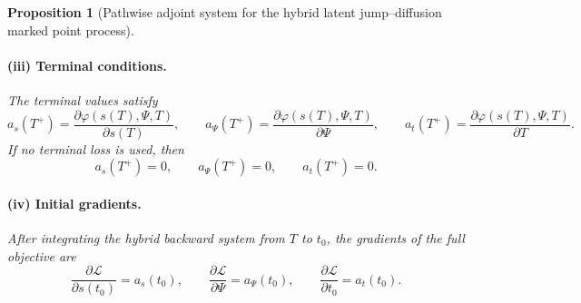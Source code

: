 \documentclass[11pt]{article}
\newtheorem{proposition}{Proposition}
\theoremstyle{definition}
\numberwithin{equation}{section}
\numberwithin{theorem}{section}
\numberwithin{proposition}{section}
\numberwithin{lemma}{section}
\numberwithin{corollary}{section}
\numberwithin{definition}{section}
\numberwithin{remark}{section}
\newcommand{\1}{\mathbbm{1}}
\begin{document}
\begin{proposition}[Pathwise adjoint system for the hybrid latent jump--diffusion marked point process]
\paragraph{(iii) Terminal conditions.}
The terminal values satisfy
\begin{equation}
\label{eq:app_prop_terminal}
a_s(T^+)=\frac{\partial \varphi(s(T),\Psi,T)}{\partial s(T)},
\qquad
a_\Psi(T^+)=\frac{\partial \varphi(s(T),\Psi,T)}{\partial \Psi},
\qquad
a_t(T^+)=\frac{\partial \varphi(s(T),\Psi,T)}{\partial T}.
\end{equation}
If no terminal loss is used, then
\[
a_s(T^+)=0,\qquad a_\Psi(T^+)=0,\qquad a_t(T^+)=0.
\]

\paragraph{(iv) Initial gradients.}
After integrating the hybrid backward system from $T$ to $t_0$, the gradients of the full objective are
\begin{equation}
\label{eq:app_prop_initial_gradients}
\frac{\partial \mathcal L}{\partial s(t_0)}=a_s(t_0),
\qquad
\frac{\partial \mathcal L}{\partial \Psi}=a_\Psi(t_0),
\qquad
\frac{\partial \mathcal L}{\partial t_0}=a_t(t_0).
\end{equation}
\end{proposition}
\end{document}
